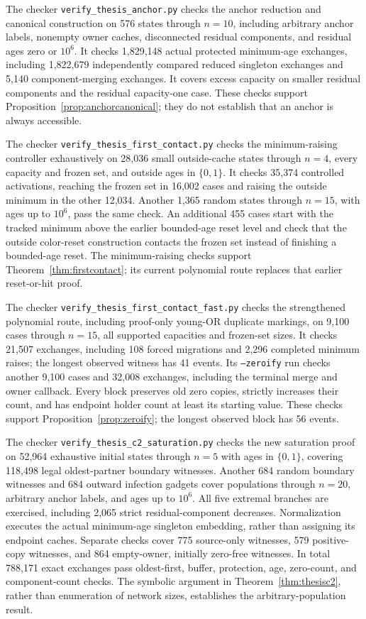 \documentclass[11pt]{article}
\begin{document}
The checker \texttt{verify\_thesis\_anchor.py} checks the
anchor reduction and canonical construction on 576 states
through $n=10$, including arbitrary anchor labels,
nonempty owner caches, disconnected residual components,
and residual ages zero or $10^6$.
It checks 1,829,148 actual protected minimum-age exchanges,
including 1,822,679 independently compared reduced
singleton exchanges and 5,140 component-merging exchanges.
It covers excess capacity on smaller residual components
and the residual capacity-one case.
These checks support Proposition~\ref{prop:anchorcanonical};
they do not establish that an anchor is always accessible.

The checker \texttt{verify\_thesis\_first\_contact.py}
checks the minimum-raising controller exhaustively on
28,036 small outside-cache states through $n=4$, every
capacity and frozen set, and outside ages in $\{0,1\}$.
It checks 35,374 controlled activations, reaching the
frozen set in 16,002 cases and raising the outside minimum
in the other 12,034. Another 1,365 random states through
$n=15$, with ages up to $10^6$, pass the same check.
An additional 455 cases start with the tracked minimum
above the earlier bounded-age reset level and check that the outside color-reset
construction contacts the frozen set instead of finishing
a bounded-age reset. The minimum-raising checks support
Theorem~\ref{thm:firstcontact}; its current polynomial
route replaces that earlier reset-or-hit proof.

The checker \texttt{verify\_thesis\_first\_contact\_fast.py}
checks the strengthened polynomial route, including
proof-only young-OR duplicate markings, on 9,100 cases
through $n=15$, all supported capacities and frozen-set
sizes. It checks 21,507 exchanges, including 108 forced
migrations and 2,296 completed minimum raises; the longest
observed witness has 41 events.
Its \texttt{--zeroify} run checks another 9,100 cases
and 32,008 exchanges, including the terminal merge and
owner callback. Every block preserves old zero copies,
strictly increases their count, and has endpoint holder
count at least its starting value. These checks support
Proposition~\ref{prop:zeroify}; the longest observed block
has 56 events.

The checker \texttt{verify\_thesis\_c2\_saturation.py}
checks the new saturation proof on 52,964 exhaustive
initial states through $n=5$ with ages in $\{0,1\}$,
covering 118,498 legal oldest-partner boundary witnesses.
Another 684 random boundary witnesses and 684 outward
infection gadgets cover populations through $n=20$,
arbitrary anchor labels, and ages up to $10^6$.
All five extremal branches are exercised, including
2,065 strict residual-component decreases. Normalization
executes the actual minimum-age singleton embedding,
rather than assigning its endpoint caches.
Separate checks cover 775 source-only witnesses, 579
positive-copy witnesses, and 864 empty-owner, initially
zero-free witnesses. In total 788,171 exact exchanges
pass oldest-first, buffer, protection, age, zero-count,
and component-count checks. The symbolic argument in
Theorem~\ref{thm:thesisc2}, rather than enumeration of
network sizes, establishes the arbitrary-population result.
\end{document}
